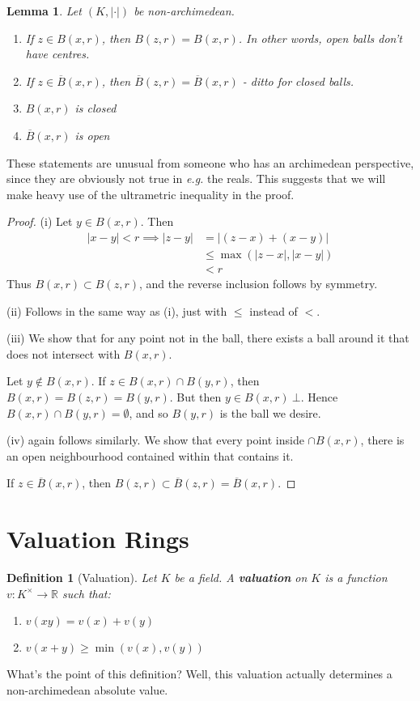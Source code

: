 \documentclass[]{article}
\theoremstyle{custhm}
\theoremstyle{cusdef}
\newtheorem{defin}[theorem]{Definition}
\theoremstyle{custhm}
\newtheorem{lemma}[theorem]{Lemma}
\theoremstyle{custhm}
\theoremstyle{custhm}
\theoremstyle{custhm}
\theoremstyle{cusdef}
\theoremstyle{remark}
\newcommand{\R}{\mathbb{R}}
\newcommand{\ra}{\rightarrow}
\newcommand{\undf}[1]{\textit{\textbf{#1}}}
\renewcommand{\it}[1]{\textit{#1}}
\newcommand{\val}[1]{\left|#1\right|}
\newcommand{\valk}{(K,|\cdot|)}
\renewcommand{\bar}{\overline}
\begin{document}
\begin{lemma}
	Let $\valk$ be non-archimedean.
	\begin{enumerate}[label = (\roman*)]
		\item If $z\in B(x,r)$, then $B(z,r) = B(x,r)$. In other words, open balls don't have centres.
		\item If $z\in \bar{B}(x,r)$, then $\bar{B}(z,r) = \bar{B}(x,r)$ - ditto for closed balls.
		\item $B(x,r)$ is closed
		\item $\bar{B}(x,r)$ is open
	\end{enumerate}
\end{lemma}
These statements are unusual from someone who has an archimedean perspective, since they are obviously not true in \it{e.g.} the reals. This suggests that we will make heavy use of the ultrametric inequality in the proof.
\begin{proof}
(i) Let $y\in B(x,r)$. Then
\begin{align*}
	\val{x-y} < r\implies \val{z-y} &= \val{(z-x) + (x-y)}\\
	&\le \max(|z-x|,|x-y|)\\
	&< r
\end{align*}
Thus $B(x,r)\subset B(z,r)$, and the reverse inclusion follows by symmetry.

(ii) Follows in the same way as (i), just with $\le$ instead of $<$.

(iii) We show that for any point not in the ball, there exists a ball around it that does not intersect with $B(x,r)$.

Let $y\not\in B(x,r)$. If $z\in B(x,r)\cap B(y,r)$, then $B(x,r) = B(z,r) = B(y,r)$. But then $y\in B(x,r)\ \bot$. Hence $B(x,r)\cap B(y,r) = \emptyset$, and so $B(y,r)$ is the ball we desire.

(iv) again follows similarly. We show that every point inside $\cap{B}(x,r)$, there is an open neighbourhood contained within that contains it.

If $z\in \bar{B}(x,r)$, then $B(z,r) \subset \bar{B}(z,r) = \bar{B}(x,r)$.
\end{proof}

\section{Valuation Rings}

\begin{defin}[Valuation]
	Let $K$ be a field. A \undf{valuation} on $K$ is a function $v:K^\times \ra \R$ such that:
	\begin{enumerate}[label = (\roman*)]
		\item $v(xy) = v(x) + v(y)$
		\item $v(x+y) \ge \min(v(x),v(y))$
	\end{enumerate}
\end{defin}
What's the point of this definition? Well, this valuation actually determines a non-archimedean absolute value.
\end{document}
